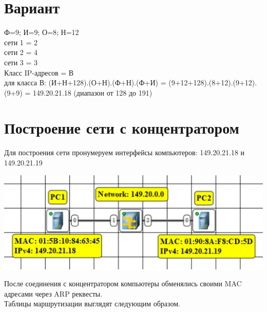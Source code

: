 \documentclass{article}
\begin{document}
\section*{Вариант}

Ф=9; И=9; О=8; Н=12
\\ 
сети 1 = 2
\\
сети 2 = 4
\\
сети 3 = 3
\\
Класс IP-адресов = В
\\
для класса В:
(И+Н+128).(О+Н).(Ф+Н).(Ф+И) = (9+12+128).(8+12).(9+12).(9+9) = 149.20.21.18 (диапазон от 128 до 191)

\section{Построение сети с концентратором}

Для построения сети пронумеруем интерфейсы компьютеров: 149.20.21.18 и 149.20.21.19

\begin{center}
    \includegraphics[width=.9\textwidth]{con-1.jpg}
\end{center}

После соединения с концентратором компьютеры обменялись своими MAC адресами через ARP реквесты.
\\
Таблицы маршрутизации выглядят следующим образом.
\end{document}
